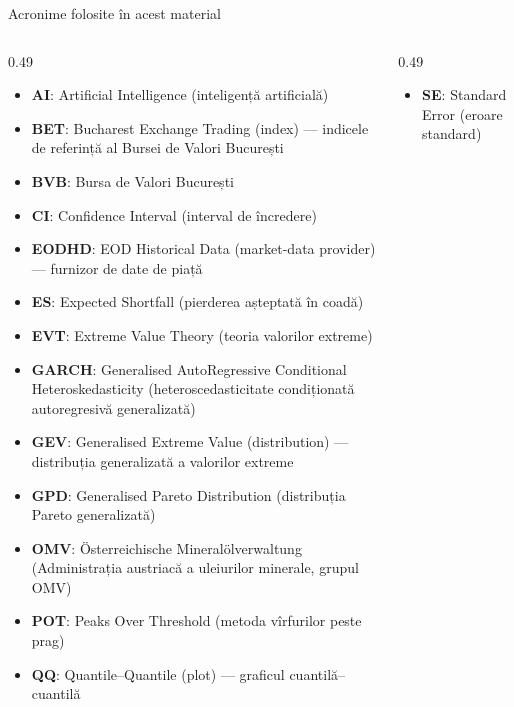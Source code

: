 {
\begin{frame}[noframenumbering]
    \titlepage
\end{frame}
}
\begin{frame}{Acronime folosite în acest material}
\begin{columns}[T]
\begin{column}{0.49\textwidth}
\begin{itemize}\setlength{\itemsep}{0pt}
    \item \textbf{AI}: Artificial Intelligence (inteligență artificială)
    \item \textbf{BET}: Bucharest Exchange Trading (index) — indicele de referință al Bursei de Valori București
    \item \textbf{BVB}: Bursa de Valori București
    \item \textbf{CI}: Confidence Interval (interval de încredere)
    \item \textbf{EODHD}: EOD Historical Data (market-data provider) — furnizor de date de piață
    \item \textbf{ES}: Expected Shortfall (pierderea așteptată în coadă)
    \item \textbf{EVT}: Extreme Value Theory (teoria valorilor extreme)
    \item \textbf{GARCH}: Generalised AutoRegressive Conditional Heteroskedasticity (heteroscedasticitate condiționată autoregresivă generalizată)
    \item \textbf{GEV}: Generalised Extreme Value (distribution) — distribuția generalizată a valorilor extreme
    \item \textbf{GPD}: Generalised Pareto Distribution (distribuția Pareto generalizată)
    \item \textbf{OMV}: Österreichische Mineralölverwaltung (Administrația austriacă a uleiurilor minerale, grupul OMV)
    \item \textbf{POT}: Peaks Over Threshold (metoda vîrfurilor peste prag)
    \item \textbf{QQ}: Quantile–Quantile (plot) — graficul cuantilă–cuantilă
\end{itemize}
\end{column}
\begin{column}{0.49\textwidth}
\begin{itemize}\setlength{\itemsep}{0pt}
    \item \textbf{SE}: Standard Error (eroare standard)
\end{itemize}
\end{column}
\end{columns}
\end{frame}

